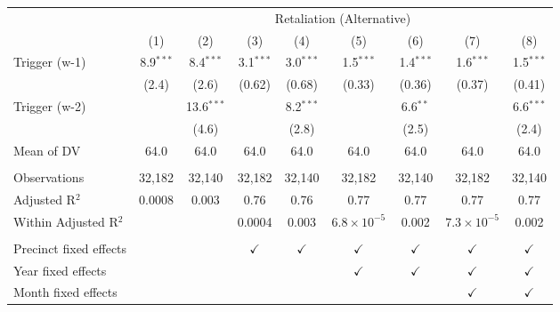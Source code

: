 \begingroup \centering \begin{tabular}{lcccccccc}    \toprule     & \multicolumn{8}{c}{Retaliation (Alternative)}\\                           & (1)         & (2)          & (3)           & (4)           & (5)                  & (6)           & (7)                  & (8)\\      \midrule     Trigger (w-1)          & 8.9$^{***}$ & 8.4$^{***}$  & 3.1$^{***}$   & 3.0$^{***}$   & 1.5$^{***}$          & 1.4$^{***}$   & 1.6$^{***}$          & 1.5$^{***}$\\                              & (2.4)       & (2.6)        & (0.62)        & (0.68)        & (0.33)               & (0.36)        & (0.37)               & (0.41)\\       Trigger (w-2)          &             & 13.6$^{***}$ &               & 8.2$^{***}$   &                      & 6.6$^{**}$    &                      & 6.6$^{***}$\\                              &             & (4.6)        &               & (2.8)         &                      & (2.5)         &                      & (2.4)\\       Mean of DV             & 64.0        & 64.0         & 64.0          & 64.0          & 64.0                 & 64.0          & 64.0                 & 64.0\\       \\    Observations           & 32,182      & 32,140       & 32,182        & 32,140        & 32,182               & 32,140        & 32,182               & 32,140\\      Adjusted R$^2$         & 0.0008      & 0.003        & 0.76          & 0.76          & 0.77                 & 0.77          & 0.77                 & 0.77\\      Within Adjusted R$^2$  &             &              & 0.0004        & 0.003         & $6.8\times 10^{-5}$  & 0.002         & $7.3\times 10^{-5}$  & 0.002\\       \\    Precinct fixed effects &             &              & $\checkmark$  & $\checkmark$  & $\checkmark$         & $\checkmark$  & $\checkmark$         & $\checkmark$\\       Year fixed effects     &             &              &               &               & $\checkmark$         & $\checkmark$  & $\checkmark$         & $\checkmark$\\       Month fixed effects    &             &              &               &               &                      &               & $\checkmark$         & $\checkmark$\\       \bottomrule \end{tabular} \par\endgroup